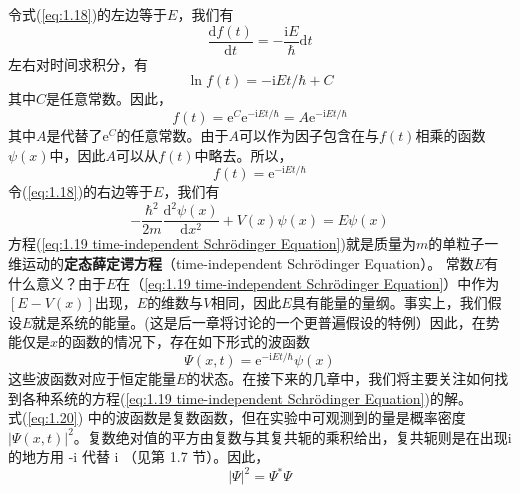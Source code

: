 	令式(\ref{eq:1.18})的左边等于$E$，我们有
	\begin{equation*}
		\frac{\mathrm{d}f\left(t\right)}{\mathrm{d}t}=-\frac{\mathrm{i}E}{\hbar}\mathrm{d}t
	\end{equation*}
	左右对时间求积分，有
	\begin{equation*}
		\ln f\left(t\right)= - \mathrm{i}Et/\hbar+C
	\end{equation*}
	其中$C$是任意常数。因此，
	\begin{equation*}
		f\left(t\right)=\mathrm{e}^C\mathrm{e}^{-\mathrm{i}Et/\hbar}=A\mathrm{e}^{-\mathrm{i}Et/\hbar}
	\end{equation*}
	其中$A$是代替了$\mathrm{e}^C$的任意常数。由于$A$可以作为因子包含在与$f\left(t\right)$相乘的函数$\psi\left(x\right)$中，因此$A$可以从$f\left(t\right)$中略去。所以，
	\begin{equation*}
		f\left(t\right)=\mathrm{e}^{-\mathrm{i}Et/\hbar}
	\end{equation*}
	\indent 令(\ref{eq:1.18})的右边等于$E$，我们有
	\begin{equation}
		\boxed{-\frac{\hbar^2}{2m}\frac{\mathrm{d}^2\psi\left(x\right)}{\mathrm{d}x^2}+V\left(x\right)\psi\left(x\right)=E\psi\left(x\right)}
		\label{eq:1.19 time-independent Schrödinger Equation}
	\end{equation}
	方程(\ref{eq:1.19 time-independent Schrödinger Equation})就是质量为$m$的单粒子一维运动的\textbf{定态薛定谔方程}（time-independent Schrödinger Equation）。	常数$E$有什么意义？由于$E$在（\ref{eq:1.19 time-independent Schrödinger Equation}）中作为$\left[E-V\left(x\right)\right]$出现，$E$的维数与$V$相同，因此$E$具有能量的量纲。事实上，我们假设$E$就是系统的能量。(这是后一章将讨论的一个更普遍假设的特例）因此，在势能仅是$x$的函数的情况下，存在如下形式的波函数
	\begin{equation}
		\Psi\left(x,t\right)=\mathrm{e}^{-\mathrm{i}Et/\hbar}\psi\left(x\right)
		\label{eq:1.20}
	\end{equation}
	这些波函数对应于恒定能量$E$的状态。在接下来的几章中，我们将主要关注如何找到各种系统的方程(\ref{eq:1.19 time-independent Schrödinger Equation})的解。\\
	\indent 式(\ref{eq:1.20}) 中的波函数是复数函数，但在实验中可观测到的量是概率密度$\left|\Psi\left(x,t\right)\right|^2$。复数绝对值的平方由复数与其复共轭的乘积给出，复共轭则是在出现i的地方用 -i 代替 i （见第 1.7 节）。因此，
	\begin{equation}
		\boxed{\left|\Psi\right|^2=\Psi^{\ast}\Psi}
		\label{eq:1.21 square of Psi}
	\end{equation}
